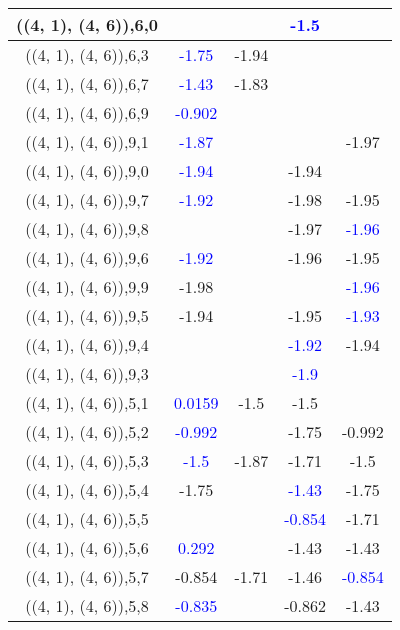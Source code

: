 \documentclass{article}
\begin{document}
\begin{center}
\begin{longtable}{|c|c|c|c|c|}
        	\hline
        	((4, 1), (4, 6)),6,0&&& \textcolor{blue}{-1.5}&\\
        	\hline
        	((4, 1), (4, 6)),6,3& \textcolor{blue}{-1.75}&-1.94&&\\
        	\hline
        	((4, 1), (4, 6)),6,7& \textcolor{blue}{-1.43}&-1.83&&\\
        	\hline
        	((4, 1), (4, 6)),6,9& \textcolor{blue}{-0.902}&&&\\
        	\hline
        	((4, 1), (4, 6)),9,1& \textcolor{blue}{-1.87}&&&-1.97\\
        	\hline
        	((4, 1), (4, 6)),9,0& \textcolor{blue}{-1.94}&&-1.94&\\
        	\hline
        	((4, 1), (4, 6)),9,7& \textcolor{blue}{-1.92}&&-1.98&-1.95\\
        	\hline
        	((4, 1), (4, 6)),9,8&&&-1.97& \textcolor{blue}{-1.96}\\
        	\hline
        	((4, 1), (4, 6)),9,6& \textcolor{blue}{-1.92}&&-1.96&-1.95\\
        	\hline
        	((4, 1), (4, 6)),9,9&-1.98&&& \textcolor{blue}{-1.96}\\
        	\hline
        	((4, 1), (4, 6)),9,5&-1.94&&-1.95& \textcolor{blue}{-1.93}\\
        	\hline
        	((4, 1), (4, 6)),9,4&&& \textcolor{blue}{-1.92}&-1.94\\
        	\hline
        	((4, 1), (4, 6)),9,3&&& \textcolor{blue}{-1.9}&\\
        	\hline
        	((4, 1), (4, 6)),5,1& \textcolor{blue}{0.0159}&-1.5&-1.5&\\
        	\hline
        	((4, 1), (4, 6)),5,2& \textcolor{blue}{-0.992}&&-1.75&-0.992\\
        	\hline
        	((4, 1), (4, 6)),5,3& \textcolor{blue}{-1.5}&-1.87&-1.71&-1.5\\
        	\hline
        	((4, 1), (4, 6)),5,4&-1.75&& \textcolor{blue}{-1.43}&-1.75\\
        	\hline
        	((4, 1), (4, 6)),5,5&&& \textcolor{blue}{-0.854}&-1.71\\
        	\hline
        	((4, 1), (4, 6)),5,6& \textcolor{blue}{0.292}&&-1.43&-1.43\\
        	\hline
        	((4, 1), (4, 6)),5,7&-0.854&-1.71&-1.46& \textcolor{blue}{-0.854}\\
        	\hline
        	((4, 1), (4, 6)),5,8& \textcolor{blue}{-0.835}&&-0.862&-1.43\\
        	\hline

\end{longtable}
\end{center}
\end{document}

